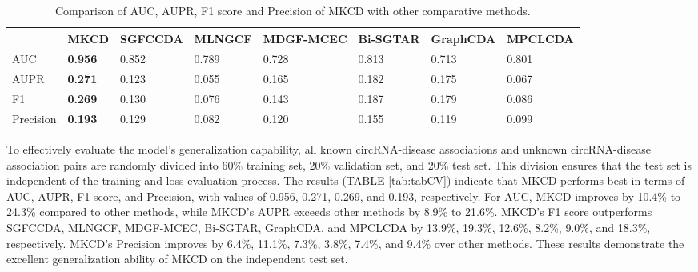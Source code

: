 \documentclass[journal,twoside,web]{ieeecolor}
\begin{document}
\begin{table}[!t]
    \centering
    \renewcommand{\arraystretch}{1.2}
    \begin{threeparttable}[b]
        \caption{Comparison of AUC, AUPR, F1 score and Precision of MKCD with other comparative methods. }\label{tab:tabCV}
        \label{tab:CV}
        \begin{tabular}{p{1.3cm}<{\centering} p{1.9cm}<{\centering}  p{1.9cm}<{\centering} p{1.9cm}<{\centering} p{2.0cm}<{\centering} p{1.9cm}<{\centering} p{1.9cm}<{\centering} p{1.9cm}<{\centering}}
            \hline
            \textbf{} & \textbf{MKCD} & \textbf{SGFCCDA} & \textbf{MLNGCF} & \textbf{MDGF-MCEC} &  \textbf{Bi-SGTAR} & \textbf{GraphCDA} & \textbf{MPCLCDA}\\
            \hline
            AUC & \textbf{0.956} & 0.852 & 0.789 &  0.728 & 0.813 & 0.713 & 0.801\\
            AUPR &\textbf{0.271} & 0.123 & 0.055 &  0.165 & 0.182 & 0.175 & 0.067\\
            F1 &\textbf{0.269} & 0.130 & 0.076 &  0.143 & 0.187 & 0.179 & 0.086\\
            Precision &\textbf{0.193} & 0.129 & 0.082 &  0.120 & 0.155 & 0.119 & 0.099\\
            \hline
        \end{tabular}
    \end{threeparttable}
    \vspace{-0.4cm}
\end{table}

To effectively evaluate the model's generalization capability, all known circRNA-disease associations and unknown circRNA-disease association pairs are randomly divided into 60\% training set, 20\% validation set, and 20\% test set. This division ensures that the test set is independent of the training and loss evaluation process. The results (TABLE \ref{tab:tabCV}) indicate that MKCD performs best in terms of AUC, AUPR, F1 score, and Precision, with values of 0.956, 0.271, 0.269, and 0.193, respectively. For AUC, MKCD improves by 10.4\% to 24.3\% compared to other methods, while MKCD's AUPR exceeds other methods by 8.9\% to 21.6\%. MKCD's F1 score outperforms SGFCCDA, MLNGCF, MDGF-MCEC, Bi-SGTAR, GraphCDA, and MPCLCDA by 13.9\%, 19.3\%, 12.6\%, 8.2\%, 9.0\%, and 18.3\%, respectively. MKCD's Precision improves by 6.4\%, 11.1\%, 7.3\%, 3.8\%, 7.4\%, and 9.4\% over other methods. These results demonstrate the excellent generalization ability of MKCD on the independent test set.
\end{document}
